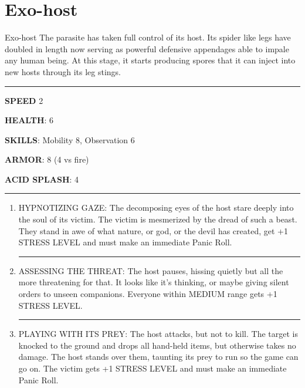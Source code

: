 \section{Exo-host}

\begin{rpg-commentbox}{Exo-host}
    The parasite has taken full control of its host. Its spider like legs have doubled in length now serving as powerful defensive appendages able to impale any human being. At this stage, it starts producing spores that it can inject into new hosts through its leg stings. 
\end{rpg-commentbox}    


\begin{rpg-commentbox}{}


    \par\noindent\rule{\textwidth}{0.4pt}

    \textbf{SPEED} 2

    \textbf{HEALTH}: 6

    \textbf{SKILLS}: Mobility 8, Observation 6
    
    \textbf{ARMOR}: 8 (4 vs fire)
    
    \textbf{ACID SPLASH}: 4

    \par\noindent\rule{\textwidth}{0.4pt}

    \begin{small}
    \begin{enumerate}
        \item HYPNOTIZING GAZE: The decomposing eyes of the host stare deeply into the soul of its
        victim. The victim is mesmerized by the dread of such a beast. They stand in awe of
        what nature, or god, or the devil has created, get +1 STRESS LEVEL and must make an immediate Panic Roll.

        \par\noindent\rule{.9\textwidth}{0.4pt}
        
        \item  ASSESSING THE THREAT: The host pauses, hissing quietly but all the more threatening
        for that. It looks like it’s thinking, 
        or maybe giving silent orders to unseen companions. Everyone within MEDIUM range gets +1 STRESS LEVEL.

        \par\noindent\rule{.9\textwidth}{0.4pt}

        \item PLAYING WITH ITS PREY: The host attacks, but not to kill. The target is knocked to the ground
        and drops all hand-held items, but otherwise takes no damage. The host stands over
        them, taunting its prey to run so the game can go on. The victim gets +1 STRESS LEVEL and
        must make an immediate Panic Roll.
        

\end{enumerate}
\end{small}
\end{rpg-commentbox}

